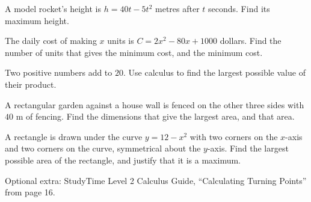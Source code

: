 \documentclass[11pt]{article}
\newlength\figunit
\begin{document}
\Q A model rocket's height is $h=40t-5t^{2}$ metres after $t$ seconds. Find its maximum height.

\Q The daily cost of making $x$ units is $C=2x^{2}-80x+1000$ dollars. Find the number of units that gives the minimum cost, and the minimum cost.

\Q Two positive numbers add to $20$. Use calculus to find the largest possible value of their product.

\Q A rectangular garden against a house wall is fenced on the other three sides with $40$ m of fencing. Find the dimensions that give the largest area, and that area.

\QX A rectangle is drawn under the curve $y=12-x^{2}$ with two corners on the $x$-axis and two corners on the curve, symmetrical about the $y$-axis. Find the largest possible area of the rectangle, and justify that it is a maximum.

\begin{minipage}[t]{0.54\linewidth}
\end{minipage}\hfill
\begin{minipage}[t]{0.44\linewidth}\centering\vspace{0pt}
\setlength\figunit{7mm}

\end{minipage}

\vfill
{\small Optional extra: StudyTime Level 2 Calculus Guide, ``Calculating Turning Points'' from page 16.\par}
\end{document}
